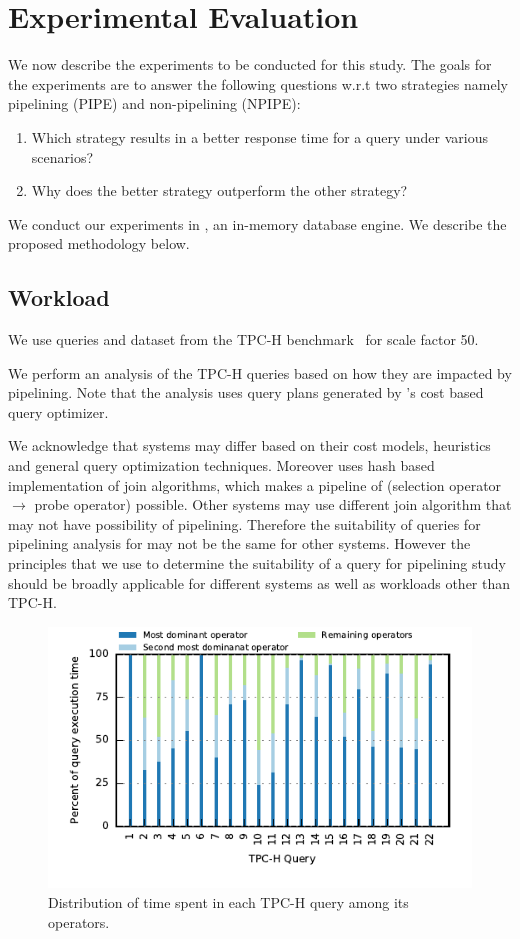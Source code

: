 \section{Experimental Evaluation}\label{sec:experiments}
We now describe the experiments to be conducted for this study.
The goals for the experiments are to answer the following questions w.r.t two strategies namely pipelining (PIPE) and non-pipelining (NPIPE):
\begin{enumerate}
	\item Which strategy results in a better response time for a query under various scenarios?
	\item Why does the better strategy outperform the other strategy?
\end{enumerate}

We conduct our experiments in \sys{}, an in-memory database engine. 
We describe the proposed methodology below. 

\subsection{Workload}
We use queries and dataset from the TPC-H benchmark~\cite{tpc-h} for scale factor 50.

We perform an analysis of the TPC-H queries based on how they are impacted by pipelining. 
Note that the analysis uses query plans generated by \sys{}'s cost based query optimizer. 

We acknowledge that systems may differ based on their cost models, heuristics and general query optimization techniques.
Moreover \sys{} uses hash based implementation of join algorithms, which makes a pipeline of (selection operator $\rightarrow$ probe operator) possible. 
Other systems may use different join algorithm that may not have possibility of pipelining. 
Therefore the suitability of queries for pipelining analysis for \sys{} may not be the same for other systems.
However the principles that we use to determine the suitability of a query for pipelining study should be broadly applicable for different systems as well as workloads other than TPC-H. 

\begin{figure}
	\centering 
	\includegraphics[width=0.65\textheight]{pipeline/figures/all-tpch-queries-time-distribution}
	\caption{Distribution of time spent in each TPC-H query among its operators.}
	\label{fig:time-distribution-all-tpch}
\end{figure}

